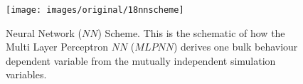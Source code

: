 \begin{figure}[!htb] 
\centering 
\texttt{[image: images/original/18nnscheme]} 
\caption[NN Scheme]{Neural Network ($NN$) Scheme. This is the schematic of how
the Multi Layer Perceptron $NN$ ($MLPNN$) derives one bulk behaviour
dependent variable from the mutually independent simulation variables.}
\label{fig:18nnscheme} 
\end{figure}


